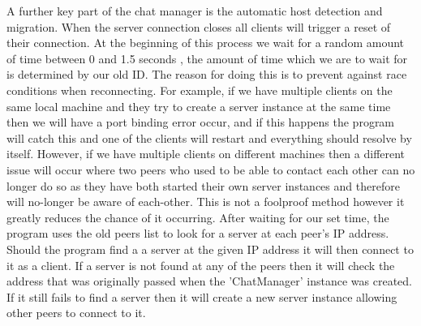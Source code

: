 \documentclass{COMPXXXX}
\begin{document}
{A further key part of the chat manager is the automatic host detection and migration. When the server connection closes all clients will trigger a reset of their connection. At the beginning of this process we wait for a random amount of time between 0 and 1.5 seconds \cite{convert_a_number_range_to_another_range_maintaining_ratio}, the amount of time which we are to wait for is determined by our old ID. The reason for doing this is to prevent against race conditions when reconnecting. For example, if we have multiple clients on the same local machine and they try to create a server instance at the same time then we will have a port binding error occur, and if this happens the program will catch this and one of the clients will restart and everything should resolve by itself. However, if we have multiple clients on different machines then a different issue will occur where two peers who used to be able to contact each other can no longer do so as they have both started their own server instances and therefore will no-longer be aware of each-other. This is not a foolproof method however it greatly reduces the chance of it occurring. After waiting for our set time, the program uses the old peers list to look for a server at each peer's IP address. Should the program find a a server at the given IP address it will then connect to it as a client. If a server is not found at any of the peers then it will check the address that was originally passed when the 'ChatManager' instance was created. If it still fails to find a server then it will create a new server instance allowing other peers to connect to it.}
\end{document}
